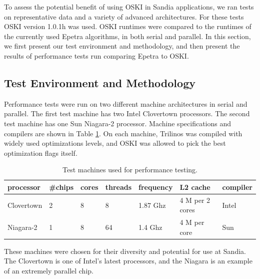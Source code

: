 To assess the potential benefit of using OSKI in Sandia applications, we ran tests on representative
data and a variety of advanced architectures.  For these tests OSKI version 1.0.1h was used.
OSKI runtimes were compared to the runtimes of the currently used Epetra algorithms, in both
serial and parallel.  In this section, we first present our test environment and methodology,
and then present the results of performance tests run comparing Epetra to OSKI.

\subsection{Test Environment and Methodology}

Performance tests were run on two different machine architectures in serial and parallel.
The first test machine has two Intel Clovertown processors.
The second test machine has one Sun Niagara-2 processor.  Machine
specifications and compilers are shown in Table \ref{IK:fig:machines}.  On
each machine,
Trilinos was compiled with widely used optimizations levels,
 and OSKI was allowed to pick the best optimization flags itself.

\begin{table}[htbp]
\begin{center}
\begin{tabular}{|l|l|l|l|l|l|l|}
\hline
processor & \#chips & cores & threads & frequency & L2 cache & compiler \\
\hline
Clovertown & 2 & 8 & 8 & 1.87 Ghz & 4 M per 2 cores & Intel \\
Niagara-2 & 1 & 8 & 64 & 1.4 Ghz & 4 M per core & Sun \\
\hline

\end{tabular}
\caption{Test machines used for performance testing.}
\label{IK:fig:machines}
\end{center}
\end{table}

These machines were chosen for their diversity and potential for use at Sandia.
The Clovertown is one of Intel's latest processors, and the Niagara is an example of an extremely parallel chip.  

